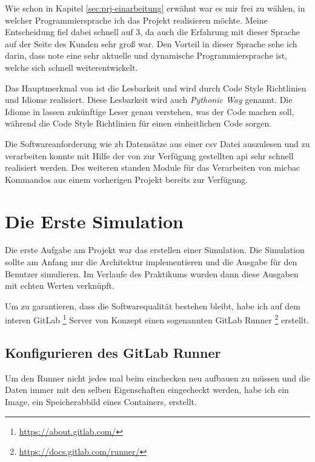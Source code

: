 Wie schon in Kapitel \ref{sec:prj-einarbeitung} erwähnt war es mir frei zu wählen, in welcher
Programmiersprache ich das Projekt realisieren möchte. Meine Entscheidung fiel dabei schnell
auf  3, da auch die Erfahrung mit dieser Sprache auf der Seite des 
Kunden sehr groß war. Den Vorteil in dieser Sprache sehe ich darin, dass 
{note} eine sehr aktuelle und dynamische Programmiersprache ist, welche sich schnell 
weiterentwickelt. 

Das Hauptmerkmal von  ist die Lesbarkeit und wird durch Code Style 
Richtlinien und Idiome realisiert. Diese Lesbarkeit wird auch \textit{Pythonic Way} genannt. 
Die Idiome in  lassen zukünftige Leser genau verstehen, was der Code 
machen soll, während die Code Style Richtlinien für einen einheitlichen Code sorgen.

Die Softwareanforderung wie \ac{zb} Datensätze aus einer \ac{csv} Datei auszulesen und zu 
verarbeiten konnte mit Hilfe der von  zur Verfügung gestellten \ac{api} 
sehr schnell realisiert werden. Des weiteren standen  Module für das 
Verarbeiten von \ac{micbac} Kommandos aus einem vorherigen Projekt bereits zur Verfügung.


\section{Die Erste Simulation}
\label{sec:first_simulation}

Die erste Aufgabe am Projekt war das erstellen einer Simulation. Die Simulation sollte am 
Anfang nur die Architektur implementieren und die Ausgabe für den Benutzer simulieren. Im 
Verlaufe des Praktikums wurden dann diese Ausgaben mit echten Werten verknüpft.

Um zu garantieren, dass die Softwarequalität bestehen bleibt, habe ich auf dem interen GitLab
\footnote{\url{https://about.gitlab.com/}} Server von Konzept einen sogenannten GitLab Runner
\footnote{\url{https://docs.gitlab.com/runner/}} erstellt. 


\subsection{Konfigurieren des GitLab Runner}
\label{subsec:gitlab_runner}

Um den Runner nicht jedes mal beim einchecken neu aufbauen zu müssen und die Daten immer mit 
den selben Eigenschaften eingecheckt werden, habe ich ein  Image, ein 
Speicherabbild eines Containers, erstellt.

